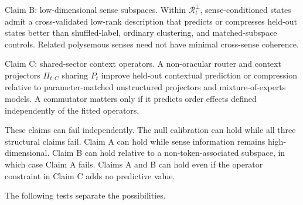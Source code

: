 \documentclass[
  aps,
  reprint,
  superscriptaddress,
  floatfix,
  nofootinbib,
  longbibliography
]{revtex4-2}
\begin{document}
{Claim B: low-dimensional sense subspaces.}
Within $\mathcal R_t^\perp$, sense-conditioned states admit a cross-validated
low-rank description that predicts or compresses held-out states better than
shuffled-label, ordinary clustering, and matched-subspace controls.  Related
polysemous senses need not have minimal cross-sense coherence.

{Claim C: shared-sector context operators.}
A non-oracular router and context projectors $\Pi_{t,C}$ sharing $P_t$ improve
held-out contextual prediction or compression relative to parameter-matched
unstructured projectors and mixture-of-experts models.  A commutator matters
only if it predicts order effects defined independently of the fitted
operators.

These claims can fail independently.  The null calibration can hold while all
three structural claims fail.  Claim A can hold while sense information
remains high-dimensional.  Claim B can hold relative to a non-token-associated
subspace, in which case Claim A fails.  Claims A and B can hold even if the
operator constraint in Claim C adds no predictive value.

The following tests separate the possibilities.
\end{document}
